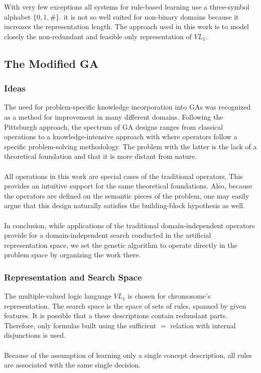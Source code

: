 \documentclass[../main.tex]{subfiles}
\begin{document}
With very few exceptions all systems for rule-based learning use a three-symbol alphabet $\{0, 1, \#\}$. it is not so well suited for non-binary domains because it increases the representation length. The approach used in this work is to model closely the non-redundant and feasible only representation of $VL_1$.

\subsection{The Modified GA}

\subsubsection{Ideas}
The need for problem-specific knowledge incorporation into GAs was recognized as a method for improvement in many
different domains. Following the Pittsburgh approach, the spectrum of GA designs ranges from classical operations to a knowledge-intensive approach with where operators follow a specific problem-solving methodology. The problem with the latter is the lack of a theoretical foundation and that it is more distant from nature.
\\\\
All operations in this work are special cases of the traditional operators. This provides an intuitive support for the
same theoretical foundations. Also, because the operators are defined on the semantic pieces of the problem, one may
easily argue that this design naturally satisfies the building-block hypothesis as well.
\\\\
In conclusion, while applications of the traditional domain-independent operators provide for a domain-independent
search conducted in the artificial representation space, we set the genetic algorithm to operate directly in the
problem space by organizing the work there.

\subsubsection{Representation and Search Space}
The multiple-valued logic language $VL_1$ is chosen for chromosome's representation. The search space is the space of
sets of rules, spanned by given features. It is possible that a these descriptions contain redundant parts. Therefore,
only formulas built using the sufficient $=$ relation with internal disjunctions is used.
\\\\
Because of the assumption of learning only a single concept description, all rules are associated with the same single
decision.
\end{document}

